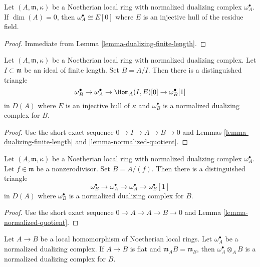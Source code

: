 \begin{lemma}
\label{lemma-dualizing-artinian}
Let $(A, \mathfrak m, \kappa)$ be a Noetherian local
ring with normalized dualizing complex $\omega_A^\bullet$.
If $\dim(A) = 0$, then $\omega_A^\bullet \cong E[0]$
where $E$ is an injective hull of the residue field.
\end{lemma}

\begin{proof}
Immediate from Lemma \ref{lemma-dualizing-finite-length}.
\end{proof}

\begin{lemma}
\label{lemma-divide-by-finite-length-ideal}
Let $(A, \mathfrak m, \kappa)$ be a Noetherian local
ring with normalized dualizing complex. Let $I \subset \mathfrak m$ be an
ideal of finite length. Set $B = A/I$. Then there is a distinguished
triangle
$$
\omega_B^\bullet \to \omega_A^\bullet \to \Hom_A(I, E)[0] \to
\omega_B^\bullet[1]
$$
in $D(A)$ where $E$ is an injective hull of $\kappa$ and
$\omega_B^\bullet$ is a normalized dualizing complex for $B$.
\end{lemma}

\begin{proof}
Use the short exact sequence $0 \to I \to A \to B \to 0$
and Lemmas \ref{lemma-dualizing-finite-length} and
\ref{lemma-normalized-quotient}.
\end{proof}

\begin{lemma}
\label{lemma-divide-by-nonzerodivisor}
Let $(A, \mathfrak m, \kappa)$ be a Noetherian local
ring with normalized dualizing complex $\omega_A^\bullet$.
Let $f \in \mathfrak m$ be a
nonzerodivisor. Set $B = A/(f)$. Then there is a distinguished
triangle
$$
\omega_B^\bullet \to \omega_A^\bullet \to \omega_A^\bullet \to
\omega_B^\bullet[1]
$$
in $D(A)$ where $\omega_B^\bullet$ is a normalized dualizing complex
for $B$.
\end{lemma}

\begin{proof}
Use the short exact sequence $0 \to A \to A \to B \to 0$
and Lemma \ref{lemma-normalized-quotient}.
\end{proof}

\begin{lemma}
\label{lemma-flat-unramified}
Let $A \to B$ be a local homomorphism of Noetherian local rings.
Let $\omega_A^\bullet$ be a normalized dualizing complex.
If $A \to B$ is flat and $\mathfrak m_A B = \mathfrak m_B$,
then $\omega_A^\bullet \otimes_A B$ is a normalized dualizing
complex for $B$.
\end{lemma}

